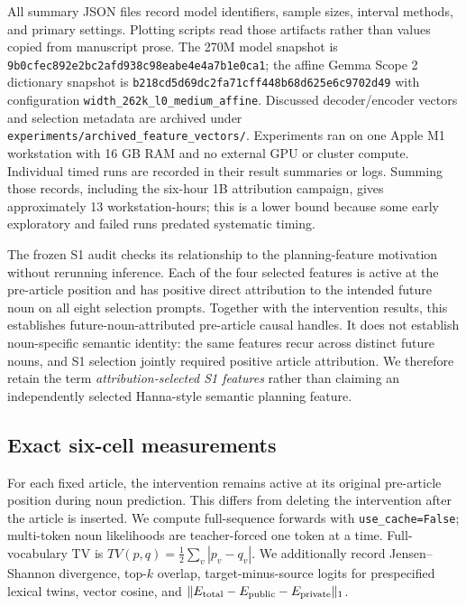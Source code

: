 \documentclass[
]{article}
\begin{document}
All summary JSON files record model identifiers, sample sizes, interval
methods, and primary settings. Plotting scripts read those artifacts
rather than values copied from manuscript prose. The 270M model snapshot
is \texttt{9b0cfec892e2bc2afd938c98eabe4e4a7b1e0ca1}; the affine Gemma
Scope 2 dictionary snapshot is
\texttt{b218cd5d69dc2fa71cff448b68d625e6c9702d49} with configuration
\texttt{width\_262k\_l0\_medium\_affine}. Discussed decoder/encoder
vectors and selection metadata are archived under
\texttt{experiments/archived\_feature\_vectors/}. Experiments ran on one
Apple M1 workstation with 16 GB RAM and no external GPU or cluster
compute. Individual timed runs are recorded in their result summaries or
logs. Summing those records, including the six-hour 1B attribution
campaign, gives approximately 13 workstation-hours; this is a lower
bound because some early exploratory and failed runs predated systematic
timing.

The frozen S1 audit checks its relationship to the planning-feature
motivation without rerunning inference. Each of the four selected
features is active at the pre-article position and has positive direct
attribution to the intended future noun on all eight selection prompts.
Together with the intervention results, this establishes
future-noun-attributed pre-article causal handles. It does not establish
noun-specific semantic identity: the same features recur across distinct
future nouns, and S1 selection jointly required positive article
attribution. We therefore retain the term \emph{attribution-selected S1
features} rather than claiming an independently selected Hanna-style
semantic planning feature.

\subsection{Exact six-cell
measurements}\label{exact-six-cell-measurements}

For each fixed article, the intervention remains active at its original
pre-article position during noun prediction. This differs from deleting
the intervention after the article is inserted. We compute full-sequence
forwards with \texttt{use\_cache=False}; multi-token noun likelihoods
are teacher-forced one token at a time. Full-vocabulary TV is
\(TV(p,q)=\frac12\sum_v|p_v-q_v|\). We additionally record
Jensen--Shannon divergence, top-\(k\) overlap, target-minus-source
logits for prespecified lexical twins, vector cosine, and
\(\|E_{\rm total}-E_{\rm public}-E_{\rm private}\|_1\).
\end{document}
